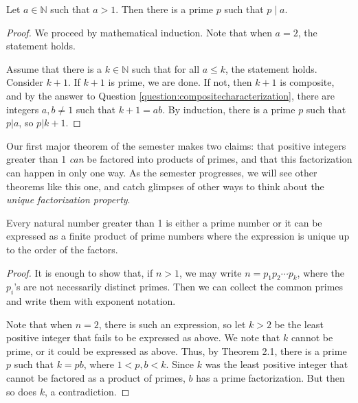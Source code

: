 \documentclass[english,course]{lecture}
\renewcommand{\le}{\leqslant}
\newenvironment{hint}{\startimportant}{}
\def\startimportant#1\end{[{Hint:} #1]\end}
\theoremstyle{plain}
\def\N{{\mathbb N}}
\def\presnotes{}
\begin{document}
\presnotes


\begin{theorem}
	Let $a\in \N$ such that $a > 1$.
	Then there is a prime $p$ such that $p\mid a$.
\end{theorem}

\begin{proof}
	We proceed by mathematical induction.	
	Note that when $a = 2$, the statement holds.
	
	Assume that there is a $k\in\N$ such that for all $a\le k$, the statement holds.
	Consider $k+1$. If $k+1$ is prime, we are done. 
	If not, then $k+1$ is composite, and by the answer to Question \ref{question:compositecharacterization}, there are integers $a,b\ne 1$ such that $k+1 = ab$.
	By induction, there is a prime $p$ such that $p|a$, so $p|k+1$.
\end{proof}

\presnotes


Our first major theorem of the semester makes two claims: that positive integers greater than 1 \emph{can} be factored into products of primes, and that this factorization can happen in only one way.
As the semester progresses, we will see other theorems like this one, and catch glimpses of other ways to think about the \emph{unique factorization property}.

	\begin{unnumberedtheorem}
	Every natural number greater than 1 is either a prime number or it can be expressed as a finite product of prime numbers where the expression is unique up to the order of the factors.
\end{unnumberedtheorem}



\begin{proof}
	It is enough to show that, if $n > 1$, we may write $n = p_1 p_2 \cdots p_k$, where the $p_i$'s are not necessarily distinct primes.
	Then we can collect the common primes and write them with exponent notation.
	
	Note that when $n = 2$, there is such an expression, so let $k > 2$ be the least positive integer that fails to be expressed as above.
	We note that $k$ cannot be prime, or it could be expressed as above.
	Thus, by Theorem 2.1, there is a prime $p$ such that $k = p b$, where $1 < p, b < k$.
	Since $k$ was the least positive integer that cannot be factored as a product of primes, $b$ has a prime factorization.
	But then so does $k$, a contradiction.
\end{proof}
\end{document}
